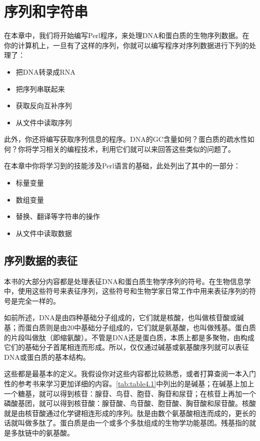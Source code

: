 \chapter{序列和字符串}
\label{chap:chapter4}
\minitoc


在本章中，我们将开始编写Perl程序，来处理DNA和蛋白质的生物序列数据。在你的计算机上，一旦有了这样的序列，你就可以编写程序对序列数据进行下列的处理了：

\begin{itemize}
  \item 把DNA转录成RNA
  \item 把序列串联起来
  \item 获取反向互补序列
  \item 从文件中读取序列
\end{itemize}

此外，你还将编写获取序列信息的程序。DNA的GC含量如何？蛋白质的疏水性如何？你将学习相关的编程技术，利用它们就可以来回答这些类似的问题了。

在本章中你将学习到的技能涉及Perl语言的基础，此处列出了其中的一部分：

\begin{itemize}
  \item 标量变量
  \item 数组变量
  \item 替换、翻译等字符串的操作
  \item 从文件中读取数据
\end{itemize}

\section{序列数据的表征}
本书的大部分内容都是处理表征DNA和蛋白质生物学序列的符号。在生物信息学中，使用这些符号来表征序列，这些符号和生物学家日常工作中用来表征序列的符号是完全一样的。

如前所述，DNA是由四种基础分子组成的，它们就是核酸，也叫做核苷酸或碱基；而蛋白质则是由20中基础分子组成的，它们就是氨基酸，也叫做残基。蛋白质的片段叫做肽（即缩氨酸）。不管是DNA还是蛋白质，本质上都是多聚物，由构成它们的基础分子首尾相连而形成。所以，仅仅通过碱基或氨基酸序列就可以表征DNA或蛋白质的基本结构。

这些都是最基本的定义。我假设你对这些内容都比较熟悉，或者打算查阅一本入门性的参考书来学习更加详细的内容。\autoref{tab:table4.1}中列出的是碱基；在碱基上加上一个糖基，就可以得到核苷：腺苷、鸟苷、胞苷、胸苷和尿苷；在核苷上再加一个磷酸基团，就可以得到核苷酸：腺苷酸、鸟苷酸、胞苷酸、胸苷酸和尿苷酸。核酸就是由核苷酸通过化学键相连形成的序列。肽是由数个氨基酸相连而成的，更长的话就叫做多肽了。蛋白质是由一个或多个多肽组成的生物学功能基团。残基指的就是多肽链中的氨基酸。

